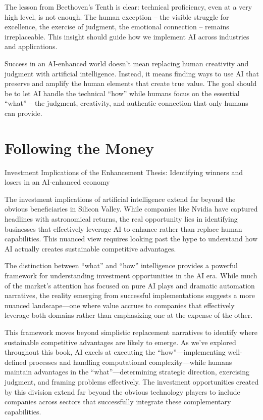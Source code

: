 \documentclass[
  Letterpaper,
]{scrbook}
\begin{document}
The lesson from Beethoven's Tenth is clear: technical proficiency, even
at a very high level, is not enough. The human
exception -- the visible
struggle for excellence, the exercise of judgment, the emotional
connection -- remains irreplaceable. This insight should guide how we
implement AI across industries and applications.

Success in an AI-enhanced world doesn't mean replacing human creativity
and judgment with artificial intelligence. Instead, it means finding
ways to use AI that preserve and amplify the human elements that create
true value. The goal should be to let AI handle the technical ``how''
while humans focus on the essential ``what'' -- the judgment,
creativity, and authentic connection that only humans can provide.


\chapter{Following the Money}\label{following-the-money}

Investment Implications of the Enhancement Thesis: Identifying winners
and losers in an AI-enhanced economy

\hfill\break

The investment implications of artificial
intelligence extend far
beyond the obvious beneficiaries in Silicon Valley. While companies like
Nvidia have captured headlines with astronomical returns, the real
opportunity lies in identifying businesses that effectively leverage AI
to enhance rather than replace human
capabilities. This
nuanced view requires looking past the hype to understand how AI
actually creates sustainable competitive advantages.

The distinction between ``what'' and ``how'' intelligence provides a
powerful framework for understanding investment opportunities in the AI
era. While much of the market's attention has focused on pure AI plays
and dramatic automation narratives, the
reality emerging from successful implementations suggests a more nuanced
landscape---one where value accrues to companies that effectively
leverage both domains rather than emphasizing one at the expense of the
other.

This framework moves beyond simplistic replacement narratives to
identify where sustainable competitive advantages are likely to emerge.
As we've explored throughout this book, AI excels at executing the
``how''---implementing well-defined processes and handling computational
complexity---while humans maintain advantages in the
``what''---determining strategic direction, exercising judgment, and
framing problems effectively. The investment opportunities created by
this division extend far beyond the obvious technology players to
include companies across sectors that successfully integrate these
complementary capabilities.
\end{document}
